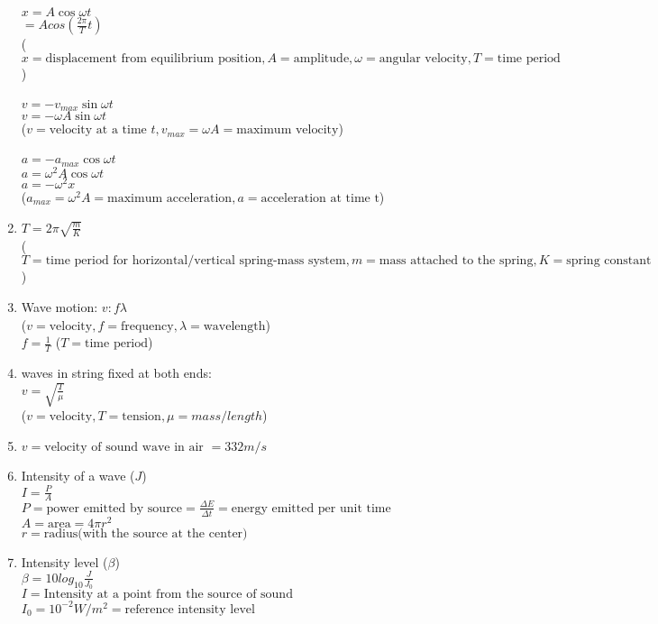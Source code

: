\documentclass[12pt, letterpaper]{article}
\begin{document}
\begin{enumerate}
          $x = A \cos \omega t$\\
          $= A cos (\frac{2 \pi}{T}t)$\\
          ($x = \text{displacement from equilibrium position}, A = \text{amplitude}, \omega = \text{angular velocity}, T = \text{time period}$)\\
          \\
          $v = -v_{max} \sin \omega t$\\
          $v = -\omega A \sin \omega t$\\
          ($v = \text{velocity at a time $t$}, v_{max} = \omega A = \text{maximum velocity}$)\\
          \\
          $a = -a_{max} \cos \omega t$\\
          $a = \omega^2 A \cos \omega t$\\
          $a = -\omega^2 x$\\
          ($a_{max} = \omega^2 A = \text{maximum acceleration}, a = \text{acceleration at time t}$)
        \item $T = 2 \pi \sqrt{\frac{m}{K}}$\\
          ($T = \text{time period for horizontal/vertical spring-mass system}, m = \text{mass attached to the spring}, K = \text{spring constant}$)
        \item Wave motion: $v: f \lambda$\\
          ($v = \text{velocity}, f = \text{frequency}, \lambda = \text{wavelength}$)\\
          $f = \frac{1}{T}$ ($T = \text{time period}$)
        \item waves in string fixed at both ends:\\
          $v = \sqrt{\frac{T}{\mu}}$\\
          ($v = \text{velocity}, T = \text{tension}, \mu = mass/length$)
        \item $v = \text{velocity of sound wave in air}$
          $= 332 m/s$
        \item Intensity of a wave ($J$)\\
          $I = \frac{P}{A}$\\
          $P = \text{power emitted by source} = \frac{\Delta E}{\Delta t} = \text{energy emitted per unit time}$\\
          $A = \text{area} = 4 \pi r^2$\\
          $r = \text{radius(with the source at the center)}$
        \item Intensity level ($\beta$)\\
          $\beta = 10 log_{10} \frac{J}{J_0}$\\
          $I = \text{Intensity at a point from the source of sound}$\\
          $I_0 = 10^{-2} W/m^2 = \text{reference intensity level}$
\end{enumerate}
\end{document}
